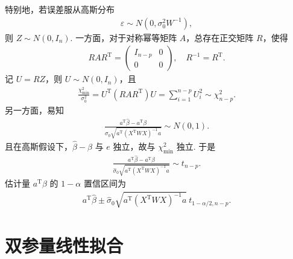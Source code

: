 特别地，若误差服从高斯分布
\begin{align*}
	\varepsilon\sim N(0,\sigma_0^2W^{-1}),
\end{align*}
则 \(Z\sim N(0,I_n)\). 一方面，对于对称幂等矩阵 \(A\)，总存在正交矩阵 \(R\)，使得
\begin{align*}
	RAR^\mathrm{T}=\begin{pmatrix}I_{n-p}&0\\0&0\end{pmatrix},
	\quad R^{-1}=R^\mathrm{T}.
\end{align*}
记 \(U=RZ\)，则 \(U\sim N(0,I_n)\)，且
\begin{align*}
	\frac{\chi_{\min}^2}{\sigma_0^2}
	=U^\mathrm{T}(RAR^\mathrm{T})U
	=\sum_{i=1}^{n-p}U_i^2\sim\chi^2_{n-p}.
\end{align*}
另一方面，易知
\begin{align*}
	\frac{a^\mathrm{T}\hat{\beta}-a^\mathrm{T}\beta}
	{\sigma_0\sqrt{a^\mathrm{T}(X^\mathrm{T}WX)^{-1}a}}\sim N(0,1).
\end{align*}
且在高斯假设下，\(\hat{\beta}-\beta\) 与 \(e\) 独立，故与 \(\chi_{\min}^2\) 独立. 于是
\begin{align*}
	\frac{a^\mathrm{T}\hat{\beta}-a^\mathrm{T}\beta}
	{\hat{\sigma}_0\sqrt{a^\mathrm{T}(X^\mathrm{T}WX)^{-1}a}}\sim t_{n-p}.
\end{align*}
估计量 \(a^\mathrm{T}\beta\) 的 \(1-\alpha\) 置信区间为
\begin{align*}
	a^\mathrm{T}\hat{\beta}\pm
	\hat{\sigma}_0\sqrt{a^\mathrm{T}(X^\mathrm{T}WX)^{-1}a}\ t_{1-\alpha/2,n-p}.
\end{align*}

\section{双参量线性拟合}

